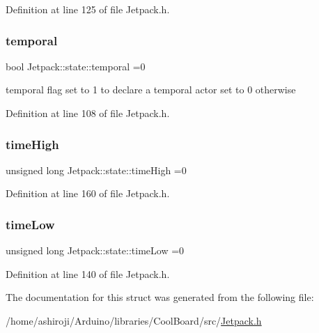Definition at line 125 of file Jetpack.\+h.

\mbox{\label{struct_jetpack_1_1state_abd6039e7a48856550b0ffbf8bcff7bdd}} 
\subsubsection{\texorpdfstring{temporal}{temporal}}
{\footnotesize\ttfamily bool Jetpack\+::state\+::temporal =0}

temporal flag set to 1 to declare a temporal actor set to 0 otherwise 

Definition at line 108 of file Jetpack.\+h.

\mbox{\label{struct_jetpack_1_1state_a97c594b20b03b46ae0a6ac544f5d6c8d}} 
\subsubsection{\texorpdfstring{time\+High}{timeHigh}}
{\footnotesize\ttfamily unsigned long Jetpack\+::state\+::time\+High =0}



Definition at line 160 of file Jetpack.\+h.

\mbox{\label{struct_jetpack_1_1state_ae544475d627308218e355a8dbb28ac74}} 
\subsubsection{\texorpdfstring{time\+Low}{timeLow}}
{\footnotesize\ttfamily unsigned long Jetpack\+::state\+::time\+Low =0}



Definition at line 140 of file Jetpack.\+h.



The documentation for this struct was generated from the following file\+:\begin{DoxyCompactItemize}
\item 
/home/ashiroji/\+Arduino/libraries/\+Cool\+Board/src/\hyperlink{_jetpack_8h}{Jetpack.\+h}\end{DoxyCompactItemize}
